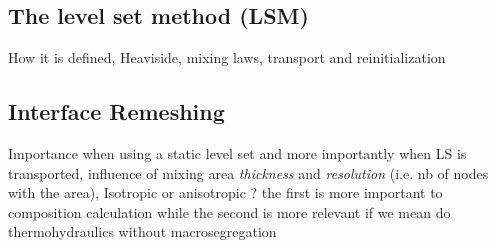 \subsection{The level set method (LSM)}
How it is defined, Heaviside, mixing laws, transport and reinitialization
\subsection{Interface Remeshing}
Importance when using a static level set and more importantly when LS is transported,
influence of mixing area \emph{thickness} and \emph{resolution} (i.e. nb of nodes with the area),
Isotropic or anisotropic ? the first is more important to composition calculation while the second
is more relevant if we mean do thermohydraulics without macrosegregation

